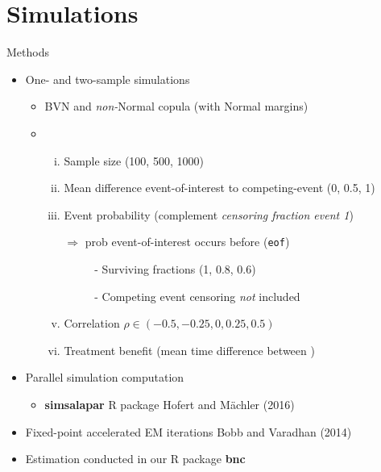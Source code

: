 \hypertarget{results}{%
\section{Simulations}\label{simulations}}

\begin{frame}[fragile]{Methods}
\protect\hypertarget{methods}{}

\begin{itemize}
\tightlist
\item
  One- and two-sample simulations

  \begin{itemize}
  \tightlist
  \item BVN and \emph{non-}Normal copula  (with Normal margins)
  \item
    {\color{DarkBlue}{Parameters varying}}

    \begin{enumerate}
    [i.]
    \tightlist
    \item
      Sample size (100, 500, 1000)  
    \item
      Mean difference event-of-interest to competing-event (0, 0.5, 1)
    \item
      Event probability (complement \emph{censoring fraction event 1}) 
      \item[]$\Rightarrow$ prob event-of-interest occurs before {\color{DarkBlue}{end of study}} (\texttt{eof})
        \begin{itemize}
        \tightlist
        \item[~~-]
          Surviving fractions (1, 0.8, 0.6)
        \item[~~-]
          Competing event censoring \emph{not} included
        \end{itemize}
    \item
      \alert{Correlation} \(\rho \in (-0.5,-0.25, 0, 0.25, 0.5)\)
    \item
      \alert{Treatment benefit} (mean time difference between {})
    \end{enumerate} %
  \end{itemize}

\item
  Parallel simulation computation
  \begin{itemize}
  \tightlist
  \item
    \textbf{simsalapar} R package Hofert and Mächler (2016)
  \end{itemize}

\item
  Fixed-point accelerated EM iterations Bobb and Varadhan (2014)
\item
  Estimation conducted in our R package \textbf{bnc}
\end{itemize}

\end{frame}
